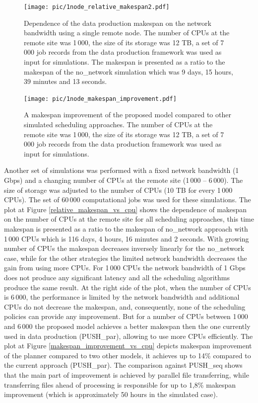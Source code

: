 \documentclass{svjour3}                     %
\begin{document}
\begin{figure}
\centering
\begin{minipage}{1\textwidth}
\centering
    \texttt{[image: pic/1node\_relative\_makespan2.pdf]}
    \caption{Dependence of the data production makespan on the network bandwidth using a single remote node. The number of CPUs at the remote site was 1\,000, the size of its storage was 12 TB, a set of 7\,000 job records from the data production framework was used as input for simulations. The makespan is presented as a ratio to the makespan of the no\_network simulation which was 9 days, 15 hours, 39 minutes and 13 seconds.}
    \label{1node_relative_makespan}
\end{minipage}\hspace{3mm}%

\begin{minipage}{1\textwidth}
\centering
    \texttt{[image: pic/1node\_makespan\_improvement.pdf]}
    \caption{A makespan improvement of the proposed model compared to other simulated scheduling approaches. The number of CPUs at the remote site was 1\,000, the size of its storage was 12 TB, a set of 7\,000 job records from the data production framework was used as input for simulations.}
    \label{1node_makespan_improvement}
\end{minipage} 
\end{figure}
Another set of simulations was performed with a fixed network bandwidth (1 Gbps) and a changing number of CPUs at the remote site (1\,000 -- 6\,000). The size of storage was adjusted to the number of CPUs (10 TB for every 1\,000 CPUs). The set of 60\,000 computational jobs was used for these simulations. The plot at Figure \ref{relative_makespan_vs_cpu} shows the dependence of makespan on the number of CPUs at the remote site for all scheduling approaches, this time makespan is presented as a ratio to the makespan of no\_network approach with 1\,000 CPUs which is 116 days, 4 hours, 16 minutes and 2 seconds. With growing number of CPUs the makespan decreases inversely linearly for the no\_network case, while for the other strategies the limited network bandwidth decreases the gain from using more CPUs. For 1\,000 CPUs the network bandwidth of 1 Gbps does not produce any significant latency and all the scheduling algorithms produce the same result. At the right side of the plot, when the number of CPUs is 6\,000, the performance is limited by the network bandwidth and additional CPUs do not decrease the makespan, and, consequently, none of the scheduling policies can provide any improvement. But for a number of CPUs between 1\,000 and 6\,000 the proposed model achieves a better makespan then the one currently used in data production (PUSH\_par), allowing to use more CPUs efficiently. The plot at Figure \ref{makespan_improvement_vs_cpu} depicts makespan improvement of the planner compared to two other models, it achieves up to 14\% compared to the current approach (PUSH\_par). The comparison against PUSH\_seq shows that the main part of improvement is achieved by parallel file transferring, while transferring files ahead of processing is responsible for up to 1,8\% makespan improvement (which is approximately 50 hours in the simulated case).
\end{document}
